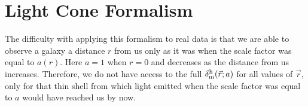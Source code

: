 \documentclass[prd,amsmath,amssymb,floatfix,superscriptaddress,nofootinbib,twocolumn]{revtex4-1}
\newcommand{\vrr}{\vec{r}}
\newcommand{\vk}{\vec{k}}
\newcommand{\ec}[1]{Eq.~(\ref{eq:#1})}
\newcommand{\rf}[1]{\ref{fig:#1}}
\newcommand{\sfig}[2]{
\texttt{[image: ../plots/\#1]}
        }
\newcommand{\Sfig}[2]{
   \begin{figure}[thbp]
   \begin{center}
    \sfig{../plots/#1.pdf}{\columnwidth}
    \caption{{\small #2}}
    \label{fig:#1}
     \end{center}
   \end{figure}
}
\newcommand\dmh{\delta_{\rm m}^{\rm h}}
\newcommand\hdmh{\hat{\delta}_{\rm m}^{\rm h}}
\begin{document}






 

\section{Light Cone Formalism} \label{sec4}

The difficulty with applying this formalism to real data is that we are able to observe a galaxy a distance $r$ from us only as it was when the scale factor was equal to $a(r)$. Here $a=1$ when $r=0$ and decreases as the distance from us increases. Therefore, we do not have access to the full $\dmh(\vec r; a)$ for all values of $\vec r$, only for that thin shell from which light emitted when the scale factor was equal to $a$ would have reached us by now.
\end{document}
